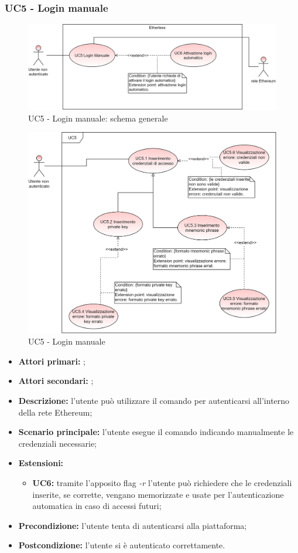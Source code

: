 \subsubsection{UC5 - Login manuale}
\begin{figure}[H]
	\centering
	\includegraphics[scale=\ucs]{./res/img/UC5G.png}
	\caption {UC5 - Login manuale: schema generale}
\end{figure}
\begin{figure}[H]
	\centering
	\includegraphics[scale=\ucs]{./res/img/UC5.png}
	\caption {UC5 - Login manuale}
\end{figure}
\begin{itemize}
	\item \textbf{Attori primari:} \una{};
	\item \textbf{Attori secondari:} \re{};
	\item \textbf{Descrizione:} l’utente può utilizzare il comando \login{} per autenticarsi all’interno della rete Ethereum; 
	\item \textbf{Scenario principale:} l'utente esegue il comando \login{} indicando manualmente le credenziali necessarie; 
	\item \textbf{Estensioni:} 
	\begin{itemize}
		\item \textbf{UC6:} tramite l’apposito flag \textit{-r} l’utente può richiedere che le credenziali inserite, se corrette, vengano memorizzate e usate per l'autenticazione automatica in caso di accessi futuri;
	\end{itemize}
	\item \textbf{Precondizione:} l’utente tenta di autenticarsi alla piattaforma;
	\item \textbf{Postcondizione:} l’utente si è autenticato correttamente.
\end{itemize}